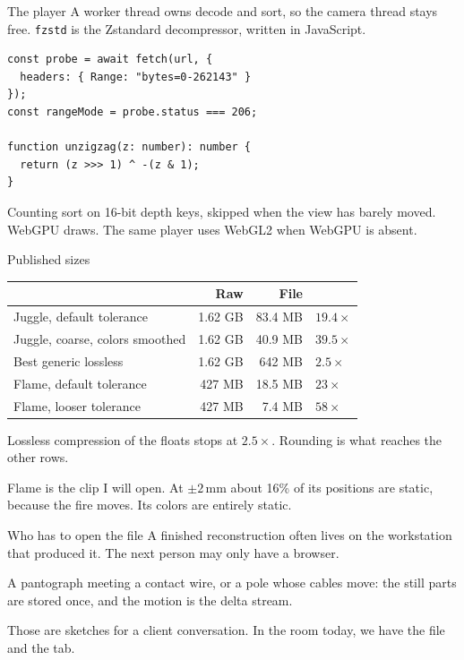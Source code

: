 \documentclass[aspectratio=169,10pt]{beamer}
\begin{document}
\begin{frame}[fragile]{The player}
  A worker thread owns decode and sort, so the camera thread stays free. \texttt{fzstd} is the Zstandard decompressor, written in JavaScript.
  \begin{lstlisting}
const probe = await fetch(url, {
  headers: { Range: "bytes=0-262143" }
});
const rangeMode = probe.status === 206;

function unzigzag(z: number): number {
  return (z >>> 1) ^ -(z & 1);
}
  \end{lstlisting}
  \small
  Counting sort on 16-bit depth keys, skipped when the view has barely moved. WebGPU draws. The same player uses WebGL2 when WebGPU is absent.
\end{frame}

\begin{frame}{Published sizes}
  \centering
  \small
  \begin{tabular}{@{}lrrl@{}}
    \toprule
    & \textbf{Raw} & \textbf{File} & \\
    \midrule
    Juggle, default tolerance & 1.62 GB & 83.4 MB & $19.4\times$ \\
    Juggle, coarse, colors smoothed & 1.62 GB & 40.9 MB & $39.5\times$ \\
    Best generic lossless & 1.62 GB & 642 MB & $2.5\times$ \\
    Flame, default tolerance & 427 MB & 18.5 MB & $23\times$ \\
    Flame, looser tolerance & 427 MB & 7.4 MB & $58\times$ \\
    \bottomrule
  \end{tabular}

  \vspace{0.7em}
  \raggedright
  Lossless compression of the floats stops at $2.5\times$. Rounding is what reaches the other rows.

  \vspace{0.4em}
  Flame is the clip I will open. At $\pm 2$\,mm about 16\% of its positions are static, because the fire moves. Its colors are entirely static.
\end{frame}

\begin{frame}{Who has to open the file}
  A finished reconstruction often lives on the workstation that produced it. The next person may only have a browser.

  \vspace{0.7em}
  A pantograph meeting a contact wire, or a pole whose cables move: the still parts are stored once, and the motion is the delta stream.

  \vspace{0.7em}
  Those are sketches for a client conversation. In the room today, we have the file and the tab.
\end{frame}
\end{document}
